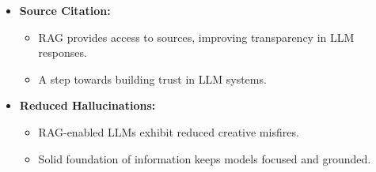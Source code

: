 \begin{frame}[fragile]
\begin{itemize}
  \item \textbf{Source Citation:}
    \begin{itemize}
      \item RAG provides access to sources, improving transparency in LLM responses.
      \item A step towards building trust in LLM systems.
    \end{itemize}

  \item \textbf{Reduced Hallucinations:}
    \begin{itemize}
      \item RAG-enabled LLMs exhibit reduced creative misfires.
      \item Solid foundation of information keeps models focused and grounded.
    \end{itemize}

\end{itemize}

\end{frame}



